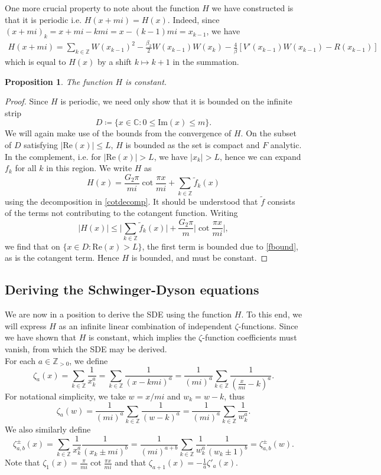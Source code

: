 \documentclass[10pt]{article}
\newcommand{\cc}{\mathbb{C}}
\newcommand{\zz}{\mathbb{Z}}
\newcommand{\re}[1]{\text{Re}(#1)}
\newcommand{\im}[1]{\text{Im}(#1)}
\theoremstyle{plain}
\newtheorem{prop}[theorem]{Proposition}
\theoremstyle{definition}
\theoremstyle{plain}
\begin{document}
One more crucial property to note about the function $H$ we have constructed is that it is periodic i.e. $H(x+mi)=H(x)$. Indeed, since $(x+mi)_k = x+mi - kmi = x-(k-1)mi = x_{k-1}$, we have
\begin{align*}
	H(x+mi)= \sum_{k\in\zz} W(x_{k-1})^2 - \frac{\beta_2}{2}W(x_{k-1})W(x_k) - \frac{4}{\beta}[V'(x_{k-1})W(x_{k-1})-R(x_{k-1})] 
\end{align*}
which is equal to $H(x)$ by a shift $k\mapsto k+1$ in the summation. 

\begin{prop}
	The function $H$ is constant. 
\end{prop}

\begin{proof}
	 Since $H$ is periodic, we need only show that  it is bounded on the infinite strip \[D\coloneqq\{x\in\cc : 0 \leq \im{x} \leq m \}.\]
	We will again make use of the bounds from the convergence of $H$. On the subset of $D$ satisfying $|\re{x}|\leq L$, $H$ is bounded as the set is compact and $F$ analytic. In the complement, i.e. for $|\re{x}|>L$, we have $|x_k|>L$, hence we can expand $f_k$ for all $k$ in this region. We write $H$ as 
	\[H(x) = \frac{G_2 \pi}{mi}\cot\frac{\pi x}{mi}+ \sum_{k\in\zz}\widetilde{f}_k(x)\]
	using the decomposition in \ref{cotdecomp}. It should be understood that $\widetilde{f}$ consists of the terms not contributing to the cotangent function. Writing 
	\[ |H(x)| \leq \bigg| \sum_{k\in\zz}\widetilde{f}_k(x)  \bigg| + \frac{G_2 \pi}{m}\bigg|\cot\frac{\pi x}{mi}\bigg|,\]
	we find that on $\{ x\in D : \re{x}>L \}$,  the first term is bounded due to \ref{fbound}, as is the cotangent term. Hence $H$ is bounded, and must be constant. 
\end{proof}


\subsection{Deriving the Schwinger-Dyson equations}

We are now in a position to derive the SDE using the function $H$. To this end, we will express $H$ as an infinite linear combination of independent $\zeta$-functions. Since we have shown that $H$ is constant, which implies the $\zeta$-function coefficients must vanish, from which the SDE may be derived. \\

For each $a\in \zz_{>0}$, we define
\[ \zeta_a(x) = \sum_{k\in\zz} \frac{1}{x_k^a} = \sum_{k\in\zz} \frac{1}{(x-kmi)^a} = \frac{1}{(mi)^a}\sum_{k\in\zz} \frac{1}{(\frac{x}{mi}-k)^a}. \] 
For notational simplicity, we take $w = x/mi$ and $w_k = w - k$, thus
\[\zeta_a(w) = \frac{1}{(mi)^a}\sum_{k\in\zz} \frac{1}{(w-k)^a} = \frac{1}{(mi)^a}\sum_{k\in\zz} \frac{1}{w_k^a}. \]
We also similarly define
\[ \zeta^\pm_{a,b}(x)= \sum_{k\in\zz}\frac{1}{x_k^a}\frac{1}{(x_k \pm mi)^b}=  \frac{1}{(mi)^{a+b}}\sum_{k\in\zz} \frac{1}{w_k^a}\frac{1}{(w_k \pm 1)^b}=\zeta^\pm_{a,b}(w). \]
Note that $\zeta_1(x)=\frac{\pi}{mi}\cot\frac{\pi x}{mi}$ and that $\zeta_{a+1}(x)=-\frac{1}{a}\zeta'_a(x)$. \\
\end{document}
